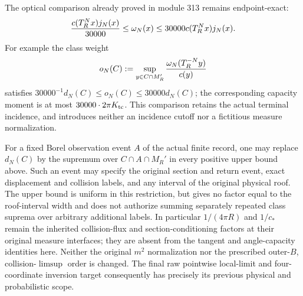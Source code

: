 The optical comparison already proved in module 313 remains
endpoint-exact:
\[
 {c(T_R^Nx)j_N(x)\over30000}
             \le\omega_N(x)\le30000c(T_R^Nx)j_N(x).
\]
For example the class weight
\[
 o_N(C):=\sup_{y\in C\cap M_R'}
                       {\omega_N(T_R^{-N}y)\over c(y)}
\]
satisfies $30000^{-1}d_N(C)\le o_N(C)\le30000d_N(C)$;
the corresponding capacity moment is at most
$30000\cdot2\pi K_{\rm tc}$.  This comparison retains the actual
terminal incidence, and introduces neither an incidence cutoff
nor a fictitious measure normalization.

For a fixed Borel observation event $A$ of the actual finite
record, one may replace $d_N(C)$ by the supremum over
$C\cap A\cap M_R'$ in every positive upper bound above.  Such
an event may specify the original section and return event, exact
displacement and collision labels, and any interval of the original
physical roof.  The upper bound is uniform in this restriction,
but gives no factor equal to the roof-interval width and does not
authorize summing separately repeated class suprema over arbitrary
additional labels.  In particular $1/(4\pi R)$ and $1/c_*$ remain
the inherited collision-flux and section-conditioning factors at
their original measure interfaces; they are absent from the tangent
and angle-capacity identities here.  Neither the original $m^2$
normalization nor the prescribed outer-$B$, collision-$\limsup$
order is changed.  The final raw pointwise local-limit and
four-coordinate inversion target consequently has precisely its
previous physical and probabilistic scope.
